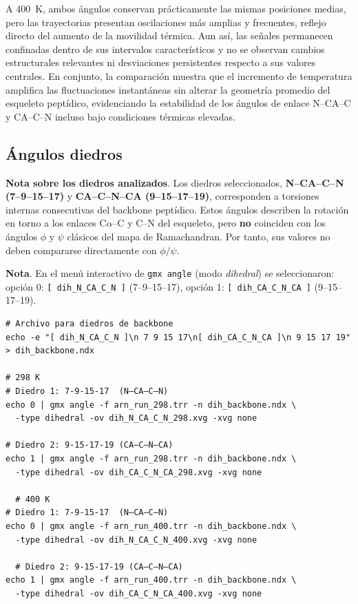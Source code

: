 \documentclass[12pt,a4paper]{article}
\begin{document}
A \SI{400}{K}, ambos ángulos conservan prácticamente las mismas posiciones medias, pero las trayectorias 
presentan oscilaciones más amplias y frecuentes, reflejo directo del aumento de la movilidad térmica. Aun así, 
las señales permanecen confinadas dentro de sus intervalos característicos y no se observan cambios estructurales 
relevantes ni desviaciones persistentes respecto a sus valores centrales. En conjunto, la comparación muestra que 
el incremento de temperatura amplifica las fluctuaciones instantáneas sin alterar la geometría promedio del 
esqueleto peptídico, evidenciando la estabilidad de los ángulos de enlace N--CA--C y CA--C--N incluso bajo 
condiciones térmicas elevadas.
\subsection{Ángulos diedros}

\noindent\textbf{Nota sobre los diedros analizados}. 
Los diedros seleccionados, \textbf{N--CA--C--N (7--9--15--17)} y 
\textbf{CA--C--N--CA (9--15--17--19)}, corresponden a torsiones internas consecutivas del 
backbone peptídico. Estos ángulos describen la rotación en torno a los enlaces 
C$\alpha$--C y C--N del esqueleto, pero \textbf{no} coinciden con los ángulos 
\(\phi\) y \(\psi\) clásicos del mapa de Ramachandran. Por tanto, sus valores no 
deben compararse directamente con \(\phi/\psi\).

\noindent\textbf{Nota}. En el menú interactivo de \texttt{gmx angle} (modo \textit{dihedral}) se seleccionaron:
opción 0: \texttt{[ dih\_N\_CA\_C\_N ]} (7--9--15--17),\quad
opción 1: \texttt{[ dih\_CA\_C\_N\_CA ]} (9--15--17--19).

\begin{lstlisting}[style=bashstyle]
# Archivo para diedros de backbone
echo -e "[ dih_N_CA_C_N ]\n 7 9 15 17\n[ dih_CA_C_N_CA ]\n 9 15 17 19" > dih_backbone.ndx

# 298 K
# Diedro 1: 7-9-15-17  (N–CA–C–N)
echo 0 | gmx angle -f arn_run_298.trr -n dih_backbone.ndx \
  -type dihedral -ov dih_N_CA_C_N_298.xvg -xvg none

# Diedro 2: 9-15-17-19 (CA–C–N–CA)
echo 1 | gmx angle -f arn_run_298.trr -n dih_backbone.ndx \
  -type dihedral -ov dih_CA_C_N_CA_298.xvg -xvg none

  # 400 K
# Diedro 1: 7-9-15-17  (N–CA–C–N)
echo 0 | gmx angle -f arn_run_400.trr -n dih_backbone.ndx \
  -type dihedral -ov dih_N_CA_C_N_400.xvg -xvg none

  # Diedro 2: 9-15-17-19 (CA–C–N–CA)
echo 1 | gmx angle -f arn_run_400.trr -n dih_backbone.ndx \
  -type dihedral -ov dih_CA_C_N_CA_400.xvg -xvg none
\end{lstlisting}
\end{document}
